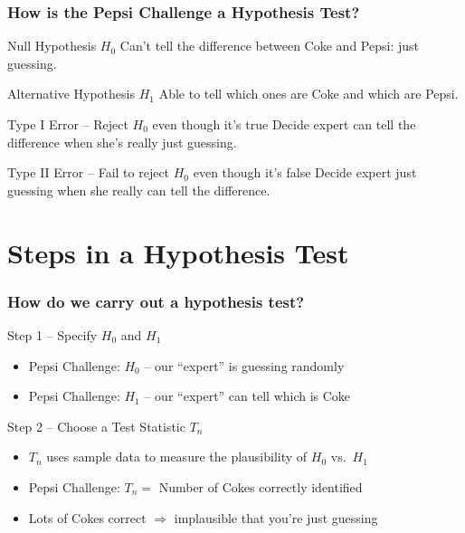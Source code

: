 \begin{frame}
\begin{columns}
\begin{column}{6cm}
\end{column} 
\end{columns} 

\end{frame}
\begin{frame}
\frametitle{How is the Pepsi Challenge a Hypothesis Test?}
	\begin{block}{Null Hypothesis $H_0$}
		Can't tell the difference between Coke and Pepsi: just guessing. \pause
\end{block}
	\begin{block}{Alternative Hypothesis $H_1$}
	Able to tell which ones are Coke and which are Pepsi.\pause
\end{block}
	\begin{block}{Type I Error -- Reject $H_0$ even though it's true} 
	Decide expert can tell the difference when she's really just guessing. \pause
\end{block}
	\begin{block}{Type II Error -- Fail to reject $H_0$ even though it's false}
	Decide expert just guessing when she really can tell the difference. 
\end{block}
\end{frame}
\section{Steps in a Hypothesis Test}
\begin{frame}
  \frametitle{How do we carry out a hypothesis test?}

  \begin{block}{Step 1 -- Specify $H_0$ and $H_1$}
   \begin{itemize}
     \item Pepsi Challenge: $H_0$ -- our ``expert'' is guessing randomly \pause
     \item Pepsi Challenge: $H_1$ -- our ``expert'' can tell which is Coke
   \end{itemize}
  \end{block}

  \pause

  \begin{block}{Step 2 -- Choose a Test Statistic $T_n$}
    \begin{itemize}
      \item $T_n$ uses sample data to measure the plausibility of $H_0$ vs.\ $H_1$ \pause
      \item Pepsi Challenge: $T_n =$ Number of Cokes correctly identified \pause
      \item Lots of Cokes correct $\Rightarrow$ implausible that you're just guessing
    \end{itemize}
  \end{block}


\end{frame}

